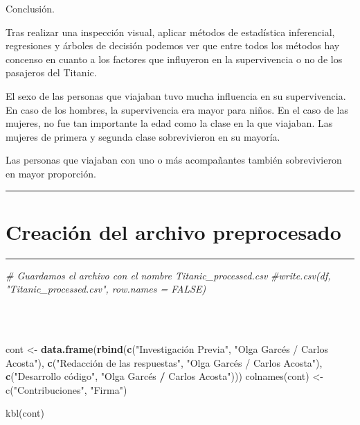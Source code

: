 \documentclass[
]{article}
\newenvironment{Shaded}{\begin{snugshade}}{\end{snugshade}}
\newcommand{\CommentTok}[1]{\textcolor[rgb]{0.56,0.35,0.01}{\textit{#1}}}
\newcommand{\KeywordTok}[1]{\textcolor[rgb]{0.13,0.29,0.53}{\textbf{#1}}}
\newcommand{\NormalTok}[1]{#1}
\newcommand{\OperatorTok}[1]{\textcolor[rgb]{0.81,0.36,0.00}{\textbf{#1}}}
\newcommand{\StringTok}[1]{\textcolor[rgb]{0.31,0.60,0.02}{#1}}
\begin{document}
Conclusión.

Tras realizar una inspección visual, aplicar métodos de estadística
inferencial, regresiones y árboles de decisión podemos ver que entre
todos los métodos hay concenso en cuanto a los factores que influyeron
en la supervivencia o no de los pasajeros del Titanic.

El sexo de las personas que viajaban tuvo mucha influencia en su
supervivencia. En caso de los hombres, la supervivencia era mayor para
niños. En el caso de las mujeres, no fue tan importante la edad como la
clase en la que viajaban. Las mujeres de primera y segunda clase
sobrevivieron en su mayoría.

Las personas que viajaban con uno o más acompañantes también
sobrevivieron en mayor proporción.

\begin{center}\rule{0.5\linewidth}{0.5pt}\end{center}

\hypertarget{creaciuxf3n-del-archivo-preprocesado}{%
\section{\texorpdfstring{\textbf{Creación del archivo
preprocesado}}{Creación del archivo preprocesado}}\label{creaciuxf3n-del-archivo-preprocesado}}

\begin{center}\rule{0.5\linewidth}{0.5pt}\end{center}

\texttt{}

\begin{Shaded}
\begin{Highlighting}[]
\CommentTok{# Guardamos el archivo con el nombre Titanic_processed.csv}
\CommentTok{#write.csv(df, "Titanic_processed.csv", row.names = FALSE)}
\end{Highlighting}
\end{Shaded}

\texttt{}\\
\texttt{}~\\

\begin{Shaded}
\begin{Highlighting}[]
\NormalTok{cont <-}\StringTok{ }\KeywordTok{data.frame}\NormalTok{(}\KeywordTok{rbind}\NormalTok{(}\KeywordTok{c}\NormalTok{(}\StringTok{"Investigación Previa"}\NormalTok{, }\StringTok{"Olga Garcés / Carlos Acosta"}\NormalTok{),}
                         \KeywordTok{c}\NormalTok{(}\StringTok{"Redacción de las respuestas"}\NormalTok{, }\StringTok{"Olga Garcés / Carlos Acosta"}\NormalTok{),}
                         \KeywordTok{c}\NormalTok{(}\StringTok{"Desarrollo código", "}\NormalTok{Olga Garcés }\OperatorTok{/}\StringTok{ }\NormalTok{Carlos Acosta}\StringTok{")))}
\StringTok{colnames(cont) <- c("}\NormalTok{Contribuciones}\StringTok{", "}\NormalTok{Firma}\StringTok{")}

\StringTok{kbl(cont)}
\end{Highlighting}
\end{Shaded}
\end{document}
